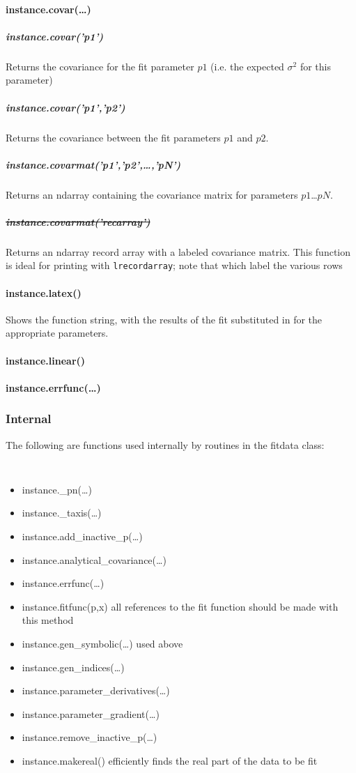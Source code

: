 \paragraph{instance.covar(\ldots)}
\subparagraph{instance.covar('p1')}
Returns the covariance for the fit parameter $p1$
    (i.e. the expected $\sigma^2$ for this parameter)
\subparagraph{instance.covar('p1','p2')}
Returns the covariance between the fit parameters $p1$ and $p2$.
\subparagraph{instance.covarmat('p1','p2',\ldots,'pN')}
Returns an ndarray containing the covariance matrix for parameters $p1$\ldots$pN$.
\subparagraph{\sout{ instance.covarmat('recarray') } }
Returns an ndarray record array with
    a labeled covariance matrix.
This function is ideal
    for printing with {\tt lrecordarray};
    note that 
    which label the various rows
\paragraph{instance.latex()}
Shows the function string,
    with the results of the fit substituted in for the
    appropriate parameters.
\paragraph{instance.linear()}
\paragraph{instance.errfunc(\ldots)}
\subsubsection{Internal}
The following are functions used internally by routines in the fitdata class:
{\tt
\begin{itemize}
    \item instance.\_pn(\ldots) 
    \item instance.\_taxis(\ldots) 
    \item instance.add\_inactive\_p(\ldots)
    \item instance.analytical\_covariance(\ldots)
    \item instance.errfunc(\ldots) 
    \item instance.fitfunc(p,x) {\rm all references to the fit function should be made with this method}
    \item instance.gen\_symbolic(\ldots)
        {\rm used above}
    \item instance.gen\_indices(\ldots)
    \item instance.parameter\_derivatives(\ldots)
    \item instance.parameter\_gradient(\ldots)
    \item instance.remove\_inactive\_p(\ldots)
    \item instance.makereal() {\rm efficiently finds the real part of the data to be fit}
\end{itemize}
}
